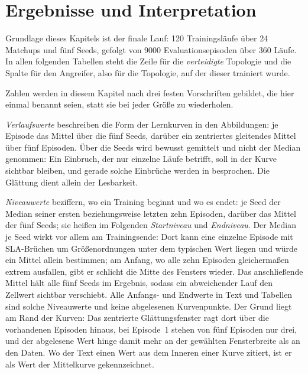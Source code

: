 \chapter{Ergebnisse und Interpretation}
\label{ch:ergebnisse}


Grundlage dieses Kapitels ist der finale Lauf: 120 Trainingsläufe über 24
Matchups und fünf Seeds, gefolgt von 9000 Evaluationsepisoden über 360 Läufe.
In allen folgenden Tabellen steht die Zeile für die \emph{verteidigte}
Topologie und die Spalte für den Angreifer, also für die Topologie, auf der
dieser trainiert wurde.

Zahlen werden in diesem Kapitel nach drei festen Vorschriften gebildet, die
hier einmal benannt seien, statt sie bei jeder Größe zu wiederholen.

\emph{Verlaufswerte} beschreiben die Form der Lernkurven in den Abbildungen:
je Episode das Mittel über die fünf Seeds, darüber ein zentriertes gleitendes
Mittel über fünf Episoden. Über die Seeds wird bewusst gemittelt und nicht
der Median genommen: Ein Einbruch, der nur einzelne Läufe betrifft, soll in
der Kurve sichtbar bleiben, und gerade solche Einbrüche werden in
 besprochen. Die Glättung dient allein der Lesbarkeit.

\emph{Niveauwerte} beziffern, wo ein Training beginnt und wo es endet: je
Seed der Median seiner ersten beziehungsweise letzten zehn Episoden, darüber
das Mittel der fünf Seeds; sie heißen im Folgenden \emph{Startniveau} und
\emph{Endniveau}. Der Median je Seed wirkt vor allem am Trainingsende: Dort kann eine
einzelne Episode mit \ac{SLA}-Brüchen um Größenordnungen unter dem typischen
Wert liegen und würde ein Mittel allein bestimmen; am Anfang, wo alle zehn
Episoden gleichermaßen extrem ausfallen, gibt er schlicht die Mitte des
Fensters wieder. Das anschließende Mittel hält alle fünf Seeds im Ergebnis, sodass ein abweichender Lauf den
Zellwert sichtbar verschiebt. Alle Anfangs- und Endwerte in Text und
Tabellen sind solche Niveauwerte und keine abgelesenen Kurvenpunkte. Der
Grund liegt am Rand der Kurven: Das zentrierte Glättungsfenster ragt dort
über die vorhandenen Episoden hinaus, bei Episode~1 stehen von fünf
Episoden nur drei, und der abgelesene Wert hinge damit mehr an der
gewählten Fensterbreite als an den Daten. Wo der Text einen Wert aus dem
Inneren einer Kurve zitiert, ist er als Wert der Mittelkurve gekennzeichnet.

